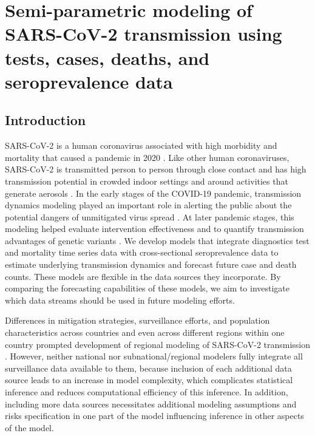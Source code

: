 \chapter{Semi-parametric modeling of SARS-CoV-2 transmission using tests, cases, deaths, and seroprevalence data}
\label{ch:content_2}
\graphicspath{{figures/ch_4/}}

\section{Introduction}
SARS-CoV-2 is a human coronavirus associated with high morbidity and mortality that caused a pandemic in 2020 \citep{Wu2020CDC, Song2020}.
Like other human coronaviruses, SARS-CoV-2 is transmitted person to person through close contact and has high transmission potential in crowded indoor settings and around activities that generate aerosols \citep{whocoronavirustrans}.
In the early stages of the COVID-19 pandemic, transmission dynamics modeling played an important role in alerting the public about the potential dangers of unmitigated virus spread \citep{prem2020effect, ferguson2020report9, davies2020}.
At later pandemic stages, this modeling helped evaluate intervention effectiveness \citep{Knockeabg2021} and to quantify transmission advantages of genetic variants \citep{Davieseabg2021}.
We develop models that integrate diagnostics test and mortality time series data with cross-sectional seroprevalence data to estimate underlying transmission dynamics and forecast future case and death counts.
These models are flexible in the data sources they incorporate.
By comparing the forecasting capabilities of these models, we aim to investigate which data streams should be used in future modeling efforts.
\par
Differences in mitigation strategies, surveillance efforts, and population characteristics across countries and even across different regions within one country prompted development of regional modeling of SARS-CoV-2 transmission \citep{anderson2020, Jewell2021complicated, morozova2021one, irons2021estimating}.
However, neither national nor subnational/regional modelers fully integrate all surveillance data available to them, because inclusion of each additional data source leads to an increase in model complexity, which complicates statistical inference and reduces computational efficiency of this inference.
In addition, including more data sources necessitates additional modeling assumptions and risks specification in one part of the model influencing inference in other aspects of the model.
